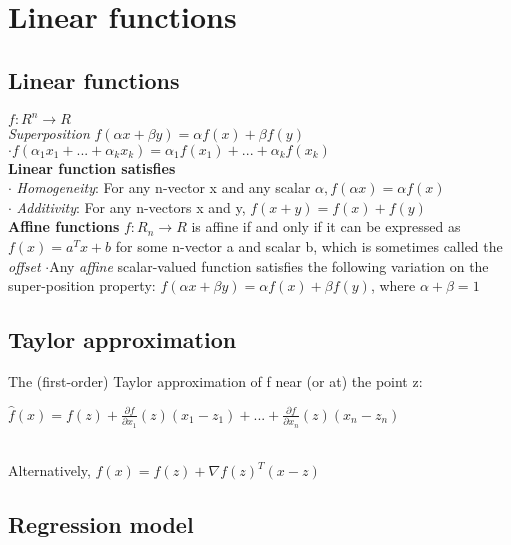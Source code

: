 \section{Linear functions}
\subsection{Linear functions} 
$f : R^n \to R$\\
\textit{Superposition}
$f(\alpha x + \beta y) = \alpha f(x) + \beta f(y)$\\
$ \cdot f(\alpha_1 x_1 +...+ \alpha_k x_k) = \alpha_1 f(x_1)+...+ \alpha_k f(x_k)$\\
\textbf{Linear function satisfies}\\
$\cdot$ \textit{Homogeneity}: For any n-vector x and any scalar $\alpha, f(\alpha x) = \alpha f(x)$ \\
$\cdot$ \textit{Additivity}: For any n-vectors x and y, $f(x + y) = f(x) + f(y)$\\
\textbf{Affine functions}
$f:R_n \to R$ is affine if and only if it can be expressed as $f(x) = a^Tx + b$ for some n-vector a and scalar b, which is sometimes called the \textit{offset}
$\cdot$Any \textit{affine} scalar-valued function satisfies the following variation on the super-position property:
$f(\alpha x + \beta y) = \alpha f(x) + \beta f(y)$, where $\alpha + \beta = 1$

\subsection{Taylor approximation}
The (first-order) Taylor approximation of f near (or at) the point z:\\
\begin{scriptsize}
$\hat{f}(x)= f(z) + \frac{\partial f}{\partial x_1}(z)(x_1 - z_1) + ... +  \frac{\partial f}{\partial x_n}(z)(x_n - z_n)$
\end{scriptsize}\\
Alternatively,
$\hat{f}(x)=f(z)+ \nabla f(z)^T(x-z)$

\subsection{Regression model}
